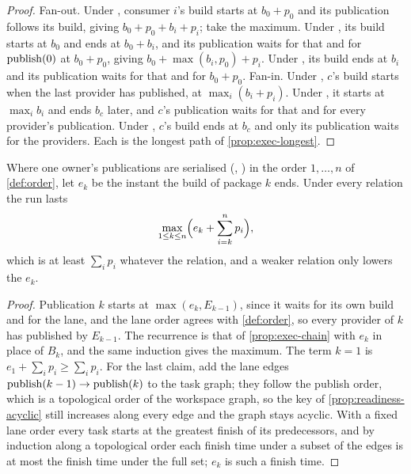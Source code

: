 \begin{proof}
Fan-out. Under , consumer $i$'s build starts at $b_0 + p_0$ and
its publication follows its build, giving $b_0 + p_0 + b_i + p_i$; take the
maximum. Under , its build starts at $b_0$ and ends at $b_0 + b_i$,
and its publication waits for that and for $\mathrm{publish}(0)$ at $b_0 + p_0$, giving
$b_0 + \max(b_i, p_0) + p_i$. Under , its build ends at $b_i$ and its
publication waits for that and for $b_0 + p_0$. Fan-in. Under ,
$c$'s build starts when the last provider has published, at $\max_i (b_i +
p_i)$. Under , it starts at $\max_i b_i$ and ends $b_c$ later, and
$c$'s publication waits for that and for every provider's publication. Under
, $c$'s build ends at $b_c$ and only its publication waits for the
providers. Each is the longest path of \cref{prop:exec-longest}.
\end{proof}

\begin{proposition}
\label{prop:exec-lane}
Where one owner's publications are serialised (, ) in
the order $1, \dots, n$ of \cref{def:order}, let $e_k$ be the instant the build
of package $k$ ends. Under every relation the run lasts
\[
  \max_{1 \le k \le n}\Bigl(e_k + \sum_{i=k}^{n} p_i\Bigr),
\]
which is at least $\sum_{i} p_i$ whatever the relation, and a weaker relation
only lowers the $e_k$.
\end{proposition}

\begin{proof}
Publication $k$ starts at $\max(e_k, E_{k-1})$, since it waits for its own
build and for the lane, and the lane order agrees with \cref{def:order}, so
every provider of $k$ has published by $E_{k-1}$. The recurrence is that of
\cref{prop:exec-chain} with $e_k$ in place of $B_k$, and the same induction
gives the maximum. The term $k = 1$ is $e_1 + \sum_i p_i \ge \sum_i p_i$. For
the last claim, add the lane edges $\mathrm{publish}(k-1) \to \mathrm{publish}(k)$ to the task
graph; they follow the publish order, which is a topological order of the
workspace graph, so the key of \cref{prop:readiness-acyclic} still increases
along every edge and the graph stays acyclic. With a fixed lane order every
task starts at the greatest finish of its predecessors, and by induction along
a topological order each finish time under a subset of the edges is at most
the finish time under the full set; $e_k$ is such a finish time.
\end{proof}

